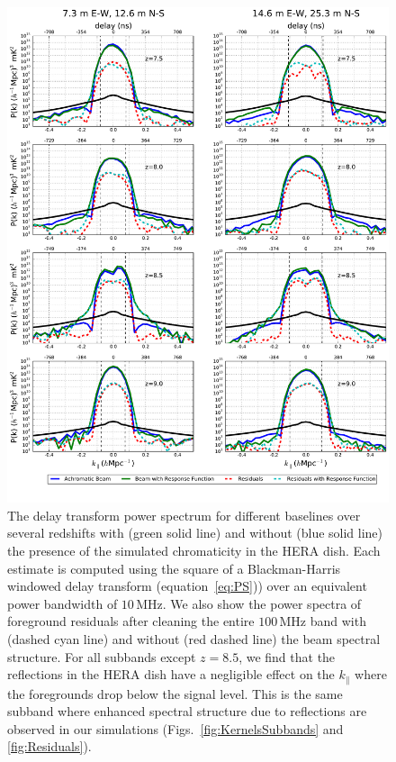 \documentclass[twocolumn]{emulateapj}
\begin{document}
\begin{figure}
\includegraphics[width=\textwidth]{figures/ps_compare_nithya_bothBaselines.pdf}
\vspace{-24pt}
\caption{The delay transform power spectrum for different baselines over several redshifts with (green solid line) and without (blue solid line) the presence of the simulated chromaticity in the HERA dish. Each estimate is computed using the square of a Blackman-Harris windowed  delay transform (equation~\ref{eq:PS})) over an equivalent power bandwidth of $10$\,MHz. We also show the power spectra of foreground residuals after cleaning the entire $100$\,MHz band with (dashed cyan line) and without (red dashed line) the beam spectral structure. For all subbands except $z=8.5$, we find that the reflections in the HERA dish have a negligible effect on the $k_\parallel$ where the foregrounds drop below the signal level. This is the same subband where enhanced spectral structure due to reflections are observed in our simulations (Figs.~\ref{fig:KernelsSubbands} and \ref{fig:Residuals}).}
\label{fig:BothBaselines}
\end{figure}
\end{document}
